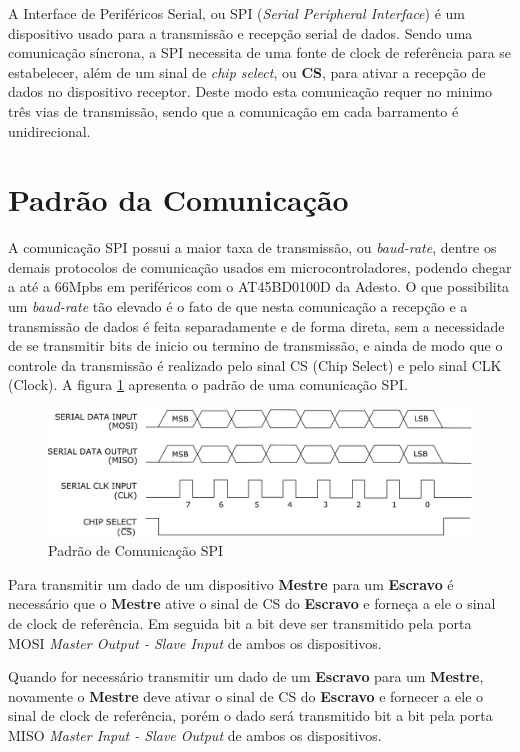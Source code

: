 A Interface de Periféricos Serial, ou SPI (\emph{Serial Peripheral Interface}) é um dispositivo usado para a transmissão e recepção serial de dados. Sendo uma comunicação síncrona, a SPI necessita de uma fonte de clock de referência para se estabelecer, além de um sinal de \emph{chip select}, ou \textbf{CS}, para ativar a recepção de dados no dispositivo receptor. Deste modo esta comunicação requer no minimo três vias de transmissão, sendo que a comunicação em cada barramento é unidirecional.

\section{Padrão da Comunicação}

A comunicação SPI possui a maior taxa de transmissão, ou \emph{baud-rate}, dentre os demais protocolos de comunicação usados em microcontroladores, podendo chegar a até a 66Mpbs em periféricos com o AT45BD0100D da Adesto. O que possibilita um  \emph{baud-rate} tão elevado é o fato de que nesta comunicação a recepção e a transmissão de dados é feita separadamente e de forma direta, sem a necessidade de se transmitir bits de inicio ou termino de transmissão, e ainda de modo que o controle da transmissão é realizado pelo sinal CS (Chip Select) e pelo sinal  CLK (Clock).  A figura \ref{fig:SPI} apresenta o padrão de uma comunicação SPI.

\begin{figure}[H]
	\centering
	\includegraphics[width=1\textwidth] {figuras/PadraoSPI.eps}
	\caption{Padrão de Comunicação SPI}
	\label{fig:SPI}
\end{figure}

Para transmitir um dado de um dispositivo \textbf{Mestre} para um \textbf{Escravo} é necessário que o \textbf{Mestre} ative o sinal de CS do \textbf{Escravo} e forneça a ele o sinal de clock de referência. Em seguida bit a bit deve ser transmitido pela porta MOSI \emph{Master Output - Slave Input} de ambos os dispositivos. 

Quando for necessário transmitir um dado de um  \textbf{Escravo} para um \textbf{Mestre}, novamente o \textbf{Mestre} deve ativar o sinal de CS do  \textbf{Escravo} e fornecer a ele o sinal de clock de referência, porém o dado será transmitido bit a bit pela porta MISO \emph{Master Input - Slave Output} de ambos os dispositivos. 

